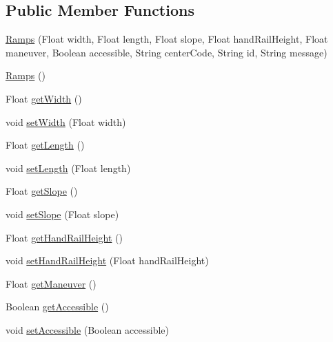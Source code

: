 \subsection*{Public Member Functions}
\begin{DoxyCompactItemize}
\item 
\mbox{\hyperlink{classcom_1_1osoc_1_1oncera_1_1javabean_1_1_ramps_a1418a3c1c5258fb48b397503233b1368}{Ramps}} (Float width, Float length, Float slope, Float hand\+Rail\+Height, Float maneuver, Boolean accessible, String center\+Code, String id, String message)
\item 
\mbox{\hyperlink{classcom_1_1osoc_1_1oncera_1_1javabean_1_1_ramps_abfe2f4f821b056632b8c74c74a1cd9ca}{Ramps}} ()
\item 
Float \mbox{\hyperlink{classcom_1_1osoc_1_1oncera_1_1javabean_1_1_ramps_a1dcaf27e1ce21365a46c531ca7081800}{get\+Width}} ()
\item 
void \mbox{\hyperlink{classcom_1_1osoc_1_1oncera_1_1javabean_1_1_ramps_a134eede0eeb7d10060054947a020f8be}{set\+Width}} (Float width)
\item 
Float \mbox{\hyperlink{classcom_1_1osoc_1_1oncera_1_1javabean_1_1_ramps_adc2a3142a625524b5832695e412fc299}{get\+Length}} ()
\item 
void \mbox{\hyperlink{classcom_1_1osoc_1_1oncera_1_1javabean_1_1_ramps_ade34673ff539f62858310481ca21dc84}{set\+Length}} (Float length)
\item 
Float \mbox{\hyperlink{classcom_1_1osoc_1_1oncera_1_1javabean_1_1_ramps_afcc443daaceae85ec7fbf46f4ce56423}{get\+Slope}} ()
\item 
void \mbox{\hyperlink{classcom_1_1osoc_1_1oncera_1_1javabean_1_1_ramps_a8c669ef1b4540e38ed6c4940799f1212}{set\+Slope}} (Float slope)
\item 
Float \mbox{\hyperlink{classcom_1_1osoc_1_1oncera_1_1javabean_1_1_ramps_a5338fa3ce6eea9b56b1cc3a883f81a96}{get\+Hand\+Rail\+Height}} ()
\item 
void \mbox{\hyperlink{classcom_1_1osoc_1_1oncera_1_1javabean_1_1_ramps_a8d5aa5e07139d122dd3a5b64b8e6dd6c}{set\+Hand\+Rail\+Height}} (Float hand\+Rail\+Height)
\item 
Float \mbox{\hyperlink{classcom_1_1osoc_1_1oncera_1_1javabean_1_1_ramps_af65b8f5297ff6d90916b2c848531be87}{get\+Maneuver}} ()
\item 
Boolean \mbox{\hyperlink{classcom_1_1osoc_1_1oncera_1_1javabean_1_1_ramps_a83c11340b43781b8c7410b971bd8237d}{get\+Accessible}} ()
\item 
void \mbox{\hyperlink{classcom_1_1osoc_1_1oncera_1_1javabean_1_1_ramps_ab0009f30961f29e5317cbd7e8cf989cc}{set\+Accessible}} (Boolean accessible)

\end{DoxyCompactItemize}
